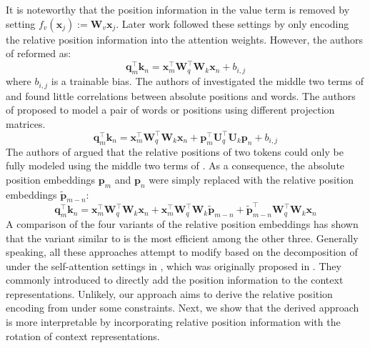 \documentclass{article}
\def\q{{\boldsymbol q}}
\def\k{{\boldsymbol k}}
\def\p{{\boldsymbol p}}
\def\x{{\boldsymbol x}}
\def\W{{\boldsymbol W}}
\begin{document}
It is noteworthy that the position information in the value term is removed by setting $f_v(\x_j):=\W_{v}\x_j$. Later work \cite{Raffel2020ExploringTL,He2020DeBERTaDB,Ke2020RethinkingPE,huang-etal-2020-improve} followed these settings by only encoding the relative position information into the attention weights. However, the authors of \cite{Raffel2020ExploringTL} reformed  as: 
\begin{equation}
	\q_m^{\intercal}\k_n=\x_m^{\intercal}\W_q^{\intercal}\W_k\x_n + b_{i,j}
	\label{fn:rela-posi3}
\end{equation}
where $b_{i,j}$ is a trainable bias. The authors of \cite{Ke2020RethinkingPE} investigated the middle two terms of  and found little correlations between absolute positions and words. The authors of \cite{Raffel2020ExploringTL} proposed to model a pair of words or positions using different projection matrices.
\begin{equation}
	\q_m^{\intercal}\k_n=\x_m^{\intercal}\W_q^{\intercal}\W_k\x_n +\p_m^{\intercal}\mathbf{U}_q^{\intercal}\mathbf{U}_k\p_n+b_{i,j}
	\label{fn:rela-posi4}
\end{equation}
The authors of \cite{He2020DeBERTaDB} argued that the relative positions of two tokens could only be fully modeled using the middle two terms of . As a consequence, the absolute position embeddings $\p_m$ and $\p_n$ were simply replaced with the relative position embeddings $\tilde{\p}_{m-n}$:
\begin{equation}
	\q_m^{\intercal}\k_n=\x_m^{\intercal}\W_q^{\intercal}\W_k\x_n+\x_m^{\intercal}\W_q^{\intercal}\W_k\tilde{\p}_{m-n}+\tilde{\p}_{m-n}^{\intercal}\W_q^{\intercal}\W_k\x_n
	\label{fn:debeta}
\end{equation}
A comparison of the four variants of the relative position embeddings \cite{Radford2018ImprovingLU:2018} has shown that the variant similar to  is the most efficient among the other three. Generally speaking, all these approaches attempt to  modify  based on the decomposition of  under the self-attention settings in , which was originally proposed in \cite{Vaswani:2017}. They commonly introduced to directly add the position information to the context representations. Unlikely, our approach aims to derive the relative position encoding from  under some constraints. Next, we show that the derived approach is more interpretable by incorporating relative position information with the rotation of context representations. 
\end{document}
